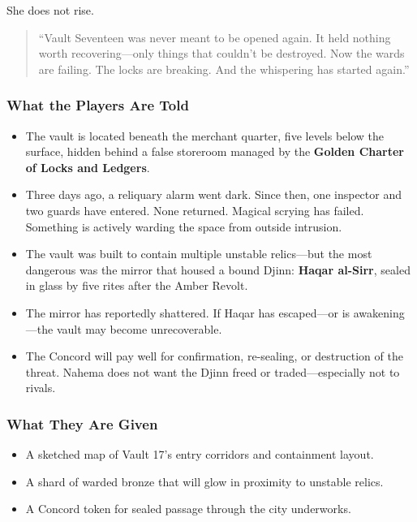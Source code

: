 She does not rise.

\begin{quote}
    “Vault Seventeen was never meant to be opened again. It held nothing worth recovering—only things that couldn’t be destroyed. Now the wards are failing. The locks are breaking. And the whispering has started again.”
\end{quote}

\subsubsection*{What the Players Are Told}

\begin{itemize}
    \item The vault is located beneath the merchant quarter, five levels below the surface, hidden behind a false storeroom managed by the \textbf{Golden Charter of Locks and Ledgers}.
    
    \item Three days ago, a reliquary alarm went dark. Since then, one inspector and two guards have entered. None returned. Magical scrying has failed. Something is actively warding the space from outside intrusion.
    
    \item The vault was built to contain multiple unstable relics—but the most dangerous was the mirror that housed a bound Djinn: \textbf{Haqar al-Sirr}, sealed in glass by five rites after the Amber Revolt.
    
    \item The mirror has reportedly shattered. If Haqar has escaped—or is awakening—the vault may become unrecoverable.
    
    \item The Concord will pay well for confirmation, re-sealing, or destruction of the threat. Nahema does not want the Djinn freed or traded—especially not to rivals.
\end{itemize}

\subsubsection*{What They Are Given}

\begin{itemize}
    \item A sketched map of Vault 17’s entry corridors and containment layout.
    \item A shard of warded bronze that will glow in proximity to unstable relics.
    \item A Concord token for sealed passage through the city underworks.
\end{itemize}

